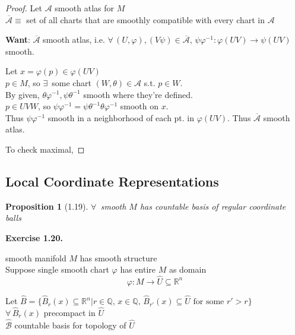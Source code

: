 \documentclass[11pt]{amsart}
\newtheorem{proposition}{Proposition}
\theoremstyle{definition}
\newcommand{\exercisehead}[1]{\medskip\noindent\textbf{Exercise #1.} }
\begin{document}
\begin{proof}
Let $\mathcal{A}$ smooth atlas for $M$   \\
$\overline{ \mathcal{A} } \equiv $ set of all charts that are smoothly compatible with every chart in $\mathcal{A}$

\textbf{Want}: $\overline{ \mathcal{A}}$ smooth atlas, i.e. $\forall \, (U, \varphi), (V \psi) \in \overline{\mathcal{A}}$, $\psi \varphi^{-1} : \varphi(UV) \to \psi(UV)$ smooth.

Let $x = \varphi(p) \in \varphi(UV)$ \\
$p\in M$, so $\exists \,$ some chart $(W, \theta) \in \mathcal{A}$ s.t. $p \in W$.  \\
By given, $\theta \varphi^{-1}, \psi \theta^{-1}$ smooth where they're defined.   \\
$p \in UVW$, so $\psi \varphi^{-1} = \psi \theta^{-1} \theta \varphi^{-1}$ smooth on $x$.  \\
Thus $\psi \varphi^{-1}$ smooth in a neighborhood of each pt. in $\varphi(UV)$.  Thus $\overline{\mathcal{A}}$ smooth atlas.

To check maximal,


\end{proof}




\subsection*{Local Coordinate Representations}

\begin{proposition}[1.19]
  $\forall \, $ smooth $M$ has countable basis of regular coordinate balls
\end{proposition}

\exercisehead{1.20}

smooth manifold $M$ has smooth structure \\
\quad Suppose single smooth chart $\varphi$ has entire $M$ as domain
\[
\varphi: M \to \widehat{U} \subseteq \mathbb{R}^n
\]

Let $\widehat{B} = \lbrace \widehat{B}_r(x) \subseteq \mathbb{R}^n | r \in \mathbb{Q}, \, x \in \mathbb{Q}, \, \widehat{B}_{r'}(x) \subseteq \widehat{U} \text{ for some } r' > r \rbrace$ \\

\quad $\forall \, \widehat{B}_r(x)$ precompact in $\widehat{U}$ \\
\quad $\widehat{\mathcal{B}}$ countable basis for topology of $\widehat{U}$
\end{document}
